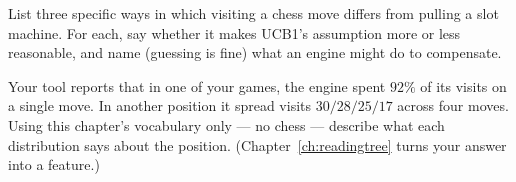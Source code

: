 \begin{exercises}
 List three specific ways in which
visiting a chess move differs from pulling a slot machine. For each, say whether it makes
UCB1's assumption more or less reasonable, and name (guessing is fine) what an engine might
do to compensate.

 Your tool reports that in one of your games, the
engine spent $92\%$ of its visits on a single move. In another position it spread visits
$30/28/25/17$ across four moves. Using this chapter's vocabulary only --- no chess ---
describe what each distribution says about the position. (Chapter~\ref{ch:readingtree} turns
your answer into a feature.)

\end{exercises}
